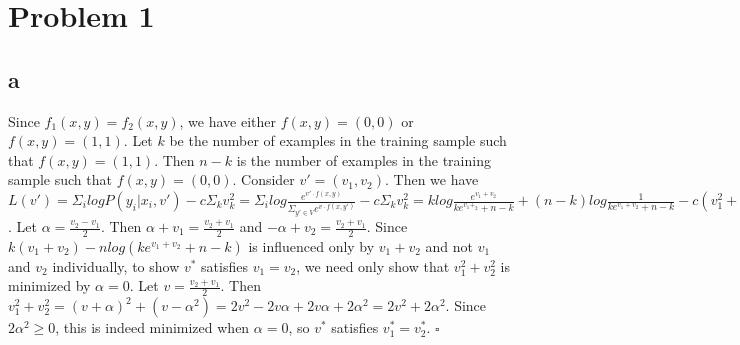 \documentclass[twoside]{homework}
\begin{document}
\maketitle

\section*{Problem 1}
\subsection*{a}
Since $f_1(x,y) = f_2(x,y)$, we have either $f(x,y) = (0,0)$ or $f(x,y) = (1,1)$.  Let $k$ be the number of examples in the training sample such that $f(x,y) = (1,1)$.  Then $n-k$ is the number of examples in the training sample such that $f(x,y) = (0,0)$. Consider $v' = (v_1,v_2)$.  Then we have $L(v') = \Sigma_ilogP(y_i|x_i,v') - c\Sigma_kv_k^2 = \Sigma_ilog \frac{e^{v' \cdot f(x,y)}}{\Sigma_{y' \in V}e^{v \cdot f(x,y')}} - c\Sigma_kv_k^2 = klog \frac{e^{v_1+v_2}}{ke^{v_1+_2}+n-k} + (n-k)log \frac{1}{ke^{v_1+v_2}+n-k} - c(v_1^2+v_2^2) = k(v_1+v_2) - klog(ke^{v_1+v_2}+n-k) + (n-k)log(1) + (k-n)log(ke^{v_1+v_2}+n-k) - c(v_1^2+v_2^2) = k(v_1+v_2) - nlog(ke^{v_1+v_2}+n-k) - c(v_1^2+v_2^2)$.  Let $\alpha = \frac{v_2-v_1}{2}$.  Then $\alpha + v_1 = \frac{v_2+v_1}{2}$ and $-\alpha + v_2 = \frac{v_2+v_1}{2}$.  Since $k(v_1+v_2) - nlog(ke^{v_1+v_2}+n-k)$ is influenced only by $v_1+v_2$ and not $v_1$ and $v_2$ individually, to show $v^*$ satisfies $v_1 = v_2$, we need only show that $v_1^2+v_2^2$ is minimized by $\alpha = 0$.  Let $v = \frac{v_2+v_1}{2}$.  Then $v_1^2+v_2^2 = (v+\alpha)^2 + (v-\alpha^2) = 2v^2 - 2v\alpha + 2v\alpha + 2\alpha^2 = 2v^2 + 2\alpha^2$.  Since $2\alpha^2 \geq 0$, this is indeed minimized when $\alpha = 0$, so $v^*$ satisfies $v^*_1 = v^*_2$.
$\square$
\end{document}

